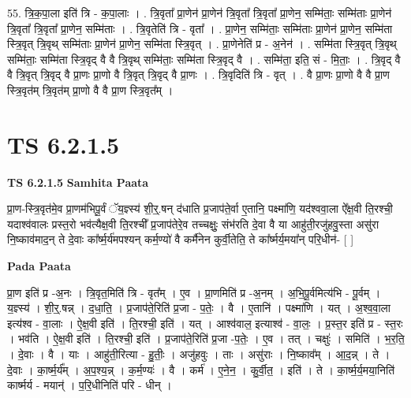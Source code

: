 \documentclass[17pt]{extarticle}
\begin{document}
55. त्रि॒क॒पा॒ला इति॑ त्रि - क॒पा॒लाः । . त्रि॒वृता᳚ प्रा॒णेन॑ प्रा॒णेन॑ त्रि॒वृता᳚ त्रि॒वृता᳚ प्रा॒णेन॒ सम्मि॑ताः॒ सम्मि॑ताः प्रा॒णेन॑ त्रि॒वृता᳚ त्रि॒वृता᳚ प्रा॒णेन॒ सम्मि॑ताः । . त्रि॒वृतेति॑ त्रि - वृता᳚ । . प्रा॒णेन॒ सम्मि॑ताः॒ सम्मि॑ताः प्रा॒णेन॑ प्रा॒णेन॒ सम्मि॑ता स्त्रि॒वृत् त्रि॒वृथ् सम्मि॑ताः प्रा॒णेन॑ प्रा॒णेन॒ सम्मि॑ता स्त्रि॒वृत् । . प्रा॒णेनेति॑ प्र - अ॒नेन॑ । . सम्मि॑ता स्त्रि॒वृत् त्रि॒वृथ् सम्मि॑ताः॒ सम्मि॑ता स्त्रि॒वृद् वै वै त्रि॒वृथ् सम्मि॑ताः॒ सम्मि॑ता स्त्रि॒वृद् वै । . सम्मि॑ता॒ इति॒ सं - मि॒ताः॒ । . त्रि॒वृद् वै वै त्रि॒वृत् त्रि॒वृद् वै प्रा॒णः प्रा॒णो वै त्रि॒वृत् त्रि॒वृद् वै प्रा॒णः । . त्रि॒वृदिति॑ त्रि - वृत् । . वै प्रा॒णः प्रा॒णो वै वै प्रा॒ण स्त्रि॒वृत॑म् त्रि॒वृत॑म् प्रा॒णो वै वै प्रा॒ण स्त्रि॒वृत᳚म् । \newline
\pagebreak
{}

\section{ TS 6.2.1.5 }

\textbf{TS 6.2.1.5 } \newline
\textbf{Samhita Paata} \newline

प्रा॒ण-स्त्रि॒वृत॑मे॒व प्रा॒णम॑भिपू॒र्वं ॅय॒ज्ञ्स्य॑ शी॒र्॒.षन् द॑धाति प्र॒जाप॑ते॒र्वा ए॒तानि॒ पक्ष्मा॑णि॒ यद॑श्ववा॒ला ऐ᳚क्ष॒वी ति॒रश्ची॒ यदाश्व॑वालः प्रस्त॒रो भव॑त्यैक्ष॒वी ति॒रश्ची᳚ प्र॒जाप॑तेरे॒व तच्चक्षुः॒ संभ॑रति दे॒वा वै या आहु॑ती॒रजु॑हवु॒स्ता असु॑रा नि॒ष्काव॑माद॒न् ते दे॒वाः का᳚र्ष्म॒र्य॑मपश्यन् कर्म॒ण्यो॑ वै कर्मै॑नेन कुर्वी॒तेति॒ ते का᳚र्ष्मर्य॒मया᳚न् परि॒धीन॑- [  ] \newline

\textbf{Pada Paata} \newline

प्रा॒ण इति॑ प्र -अ॒नः । त्रि॒वृत॒मिति॑ त्रि - वृत᳚म् । ए॒व । प्रा॒णमिति॑ प्र -अ॒नम् । अ॒भि॒पू॒र्वमित्य॑भि - पू॒र्वम् । य॒ज्ञ्स्य॑ । शी॒र्॒.षन्न् । द॒धा॒ति॒ । प्र॒जाप॑ते॒रिति॑ प्र॒जा - प॒तेः॒ । वै । ए॒तानि॑ । पक्ष्मा॑णि । यत् । अ॒श्व॒वा॒ला इत्य॑श्व - वा॒लाः । ऐ॒क्ष॒वी इति॑ । ति॒रश्ची॒ इति॑ । यत् । आश्व॑वाल॒ इत्याश्व॑ - वा॒लः॒ । प्र॒स्त॒र इति॑ प्र - स्त॒रः । भव॑ति । ऐ॒क्ष॒वी इति॑ । ति॒रश्ची॒ इति॑ । प्र॒जाप॑ते॒रिति॑ प्र॒जा -प॒तेः॒ । ए॒व । तत् । चक्षुः॑ । समिति॑ । भ॒र॒ति॒ । दे॒वाः । वै । याः । आहु॑ती॒रित्या - हु॒तीः॒ । अजु॑हवुः । ताः । असु॑राः । नि॒ष्काव᳚म् । आ॒द॒न्न् । ते । दे॒वाः । का॒र्ष्म॒र्य᳚म् । अ॒प॒श्य॒न्न् । क॒र्म॒ण्यः॑ । वै । कर्म॑ । ए॒ने॒न॒ । कु॒र्वी॒त॒ । इति॑ । ते । का॒र्ष्म॒र्य॒मया॒निति॑ कार्ष्मर्य - मयान्॑ । प॒रि॒धीनिति॑ परि - धीन् ।  \newline
\end{document}
